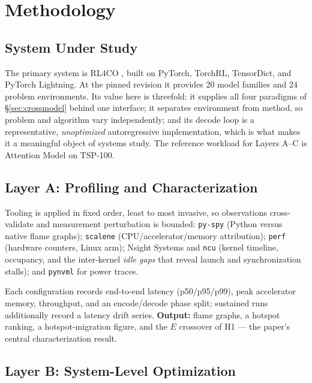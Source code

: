 \documentclass[11pt,a4paper,twocolumn]{article}
\begin{document}
\section{Methodology}

\subsection{System Under Study}

The primary system is RL4CO \citep{berto2023rl4co}, built on PyTorch, TorchRL,
TensorDict, and PyTorch Lightning. At the pinned revision it provides 20 model
families and 24 problem environments. Its value here is threefold: it supplies all
four paradigms of \S\ref{sec:crossmodel} behind one interface; it separates
environment from method, so problem and algorithm vary independently; and its
decode loop is a representative, \emph{unoptimized} autoregressive implementation,
which is what makes it a meaningful object of systems study. The reference workload
for Layers A--C is Attention Model on TSP-100.

\subsection{Layer A: Profiling and Characterization}

Tooling is applied in fixed order, least to most invasive, so observations
cross-validate and measurement perturbation is bounded: \texttt{py-spy} (Python
versus native flame graphs); \texttt{scalene} (CPU/accelerator/memory attribution);
\texttt{perf} (hardware counters, Linux arm); Nsight Systems and \texttt{ncu}
(kernel timeline, occupancy, and the inter-kernel \emph{idle gaps} that reveal
launch and synchronization stalls); and \texttt{pynvml} for power traces.

Each configuration records end-to-end latency (p50/p95/p99), peak accelerator
memory, throughput, and an encode/decode phase split; sustained runs additionally
record a latency drift series. \textbf{Output:} flame graphs, a hotspot ranking, a
hotspot-migration figure, and the $E$ crossover of H1 --- the paper's central
characterization result.

\subsection{Layer B: System-Level Optimization}
\end{document}
